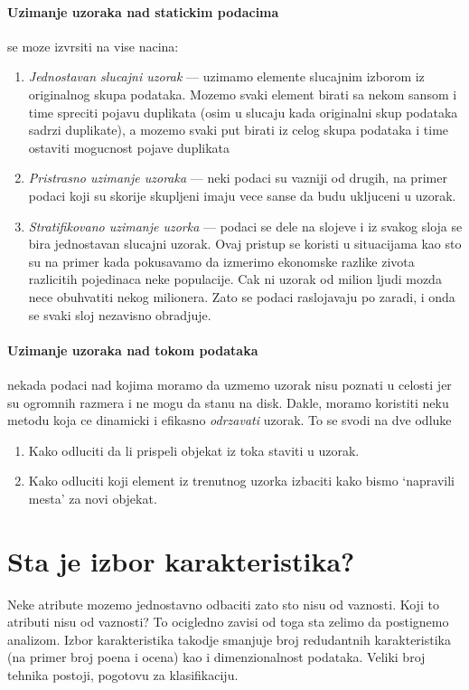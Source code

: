 \documentclass[a4paper]{article}
\begin{document}
\paragraph{Uzimanje uzoraka nad statickim podacima} se moze izvrsiti na vise nacina:
\begin{enumerate}
    \item \emph{Jednostavan slucajni uzorak } --- uzimamo elemente slucajnim izborom iz originalnog skupa
        podataka. Mozemo svaki element birati sa nekom sansom i time spreciti pojavu duplikata (osim
        u slucaju kada originalni skup podataka sadrzi duplikate), a mozemo svaki put birati iz
        celog skupa podataka i time ostaviti mogucnost pojave duplikata
    \item \emph{Pristrasno uzimanje uzoraka} --- neki podaci su vazniji od drugih, na primer podaci
        koji su skorije skupljeni imaju vece sanse da budu ukljuceni u uzorak.
    \item \emph{Stratifikovano uzimanje uzorka} --- podaci se dele na slojeve i iz svakog sloja se
        bira jednostavan slucajni uzorak. Ovaj pristup se koristi u situacijama kao sto su na primer
        kada pokusavamo da izmerimo ekonomske razlike zivota razlicitih pojedinaca neke populacije.
        Cak ni uzorak od milion ljudi mozda nece obuhvatiti nekog milionera. Zato se podaci
        raslojavaju po zaradi, i onda se svaki sloj nezavisno obradjuje.
\end{enumerate}

\paragraph{Uzimanje uzoraka nad tokom podataka} nekada podaci nad kojima moramo da uzmemo uzorak
nisu poznati u celosti jer su ogromnih razmera i ne mogu da stanu na disk. Dakle, moramo koristiti
neku metodu koja ce dinamicki i efikasno \emph{odrzavati} uzorak. To se svodi na dve odluke
\begin{enumerate}
    \item Kako odluciti da li prispeli objekat iz toka staviti u uzorak.
    \item Kako odluciti koji element iz trenutnog uzorka izbaciti kako bismo `napravili mesta' za
        novi objekat.
\end{enumerate}

\section{Sta je izbor karakteristika?}
Neke atribute mozemo jednostavno odbaciti zato sto nisu od vaznosti. Koji to atributi nisu od
vaznosti? To ocigledno zavisi od toga sta zelimo da postignemo analizom. Izbor karakteristika
takodje smanjuje broj redudantnih karakteristika (na primer broj poena i ocena) kao i dimenzionalnost
podataka. Veliki broj tehnika postoji, pogotovu za klasifikaciju.
\end{document}
